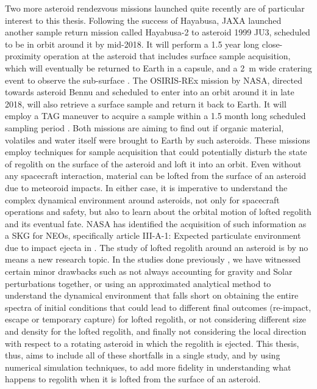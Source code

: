 Two more asteroid rendezvous missions launched quite recently are of particular interest to this thesis. Following the success of Hayabusa, \gls{JAXA} launched another sample return mission called Hayabusa-2 to asteroid 1999 JU3, scheduled to be in orbit around it by mid-2018. It will perform a 1.5 year long close-proximity operation at the asteroid that includes surface sample acquisition, which will eventually be returned to Earth in a capsule, and a \SI{2}{\metre} wide cratering event to observe the sub-surface \parencite{TsudaHayabusa2SystemDesign}. The \gls{OSIRIS-REx} mission by \gls{NASA}, directed towards asteroid Bennu and scheduled to enter into an orbit around it in late 2018, will also retrieve a surface sample and return it back to Earth. It will employ a \gls{TAG} maneuver to acquire a sample within a 1.5 month long scheduled sampling period \parencite{berry2013osiris}. Both missions are aiming to find out if organic material, volatiles and water itself were brought to Earth by such asteroids. These missions employ techniques for sample acquisition that could potentially disturb the state of regolith on the surface of the asteroid and loft it into an orbit. Even without any spacecraft interaction, material can be lofted from the surface of an asteroid due to meteoroid impacts. In either case, it is imperative to understand the complex dynamical environment around asteroids, not only for spacecraft operations and safety, but also to learn about the orbital motion of lofted regolith and its eventual fate. \gls{NASA} has identified the acquisition of such information as a \gls{SKG} for \glspl{NEO}, specifically article III-A-1: Expected particulate environment due to impact ejecta in \cite{nasa_skg}.
%
\newline\newline
%
The study of lofted regolith around an asteroid is by no means a new research topic. In the studies done previously \parencite{richter1995stability,lee1996dust,scheeres1996orbits,scheeres2000ejecta,korycansky2004_impactEjecta,yarnoz2014passive}, we have witnessed certain minor drawbacks such as not always accounting for gravity and Solar perturbations together, or using an approximated analytical method to understand the dynamical environment that falls short on obtaining the entire spectra of initial conditions that could lead to different final outcomes (re-impact, escape or temporary capture) for lofted regolith, or not considering different size and density for the lofted regolith, and finally not considering the local direction with respect to a rotating asteroid in which the regolith is ejected. This thesis, thus, aims to include all of these shortfalls in a single study, and by using numerical simulation techniques, to add more fidelity in understanding what happens to regolith when it is lofted from the surface of an asteroid.
